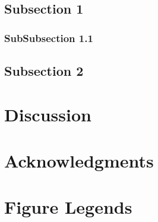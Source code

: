 \subsection*{Subsection 1}

\subsubsection*{SubSubsection 1.1}

\subsection*{Subsection 2}

\section*{Discussion}




\section*{Acknowledgments}





%
%
% 

\section*{Figure Legends}
%


